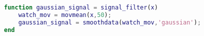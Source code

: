 \begin{lstlisting}[language=Matlab,  basicstyle=\footnotesize]
function gaussian_signal = signal_filter(x)
    watch_mov = movmean(x,50);
    gaussian_signal = smoothdata(watch_mov,'gaussian');
end
\end{lstlisting}